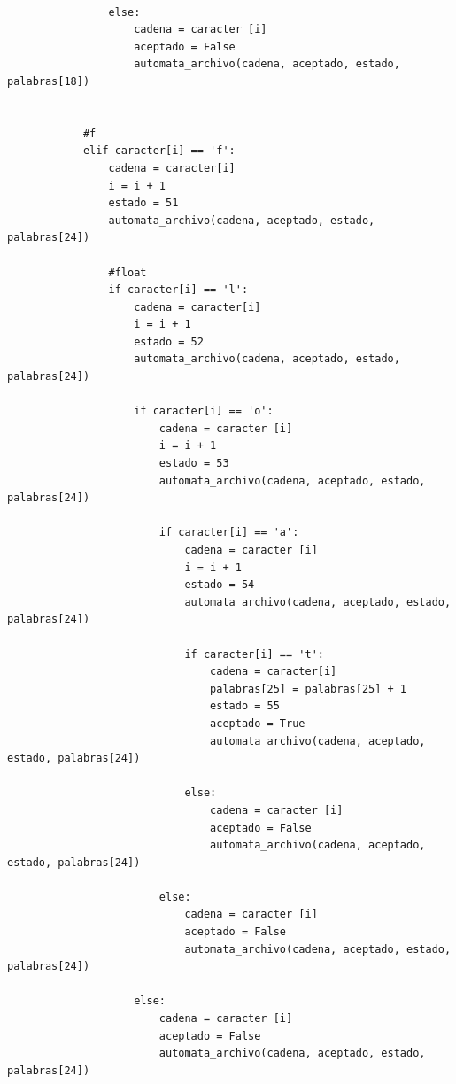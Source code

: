 \documentclass{article}
\begin{document}
\begin{flushleft}
\begin{lstlisting}
                
                else:
                    cadena = caracter [i]
                    aceptado = False
                    automata_archivo(cadena, aceptado, estado, palabras[18])
            
            
            #f
            elif caracter[i] == 'f':
                cadena = caracter[i]
                i = i + 1
                estado = 51
                automata_archivo(cadena, aceptado, estado, palabras[24])
                
                #float
                if caracter[i] == 'l':
                    cadena = caracter[i]
                    i = i + 1
                    estado = 52
                    automata_archivo(cadena, aceptado, estado, palabras[24])
                    
                    if caracter[i] == 'o':
                        cadena = caracter [i]
                        i = i + 1
                        estado = 53
                        automata_archivo(cadena, aceptado, estado, palabras[24])   
                        
                        if caracter[i] == 'a':
                            cadena = caracter [i]
                            i = i + 1
                            estado = 54
                            automata_archivo(cadena, aceptado, estado, palabras[24])
                            
                            if caracter[i] == 't':
                                cadena = caracter[i]
                                palabras[25] = palabras[25] + 1
                                estado = 55
                                aceptado = True
                                automata_archivo(cadena, aceptado, estado, palabras[24])
                                
                            else:
                                cadena = caracter [i]
                                aceptado = False
                                automata_archivo(cadena, aceptado, estado, palabras[24])
                                
                        else:
                            cadena = caracter [i]
                            aceptado = False
                            automata_archivo(cadena, aceptado, estado, palabras[24])
                    
                    else:
                        cadena = caracter [i]
                        aceptado = False
                        automata_archivo(cadena, aceptado, estado, palabras[24])
                        

\end{lstlisting}
\end{flushleft}
\end{document}
